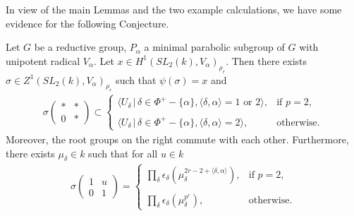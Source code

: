 In view of the main Lemmas and the two example calculations, we have some evidence for the following Conjecture.
\begin{conjecture} Let $G$ be a reductive group, $P_\alpha$ a minimal parabolic subgroup of $G$ with unipotent radical $V_\alpha$. Let $x \in H^1(SL_2(k), V_\alpha)_{\rho_r}$. Then there exists $\sigma \in Z^1(SL_2(k), V_\alpha)_{\rho_r}$ such that $\psi(\sigma) = x$ and
\begin{align*}
	\sigma\left(\begin{matrix}* & * \\0 & *\end{matrix}\right) \subset
		\left\{\begin{array}{ll}
			\langle U_\delta \,|\, \delta \in \Phi^+ - \{\alpha\}, \langle \delta, \alpha \rangle = 1\textrm{ or }2\rangle, & \textrm{if }p = 2,\\ \\
			\langle U_\delta \,|\, \delta \in \Phi^+ - \{\alpha\}, \langle \delta, \alpha \rangle = 2\rangle, & \textrm{otherwise}.
		\end{array}\right.
\end{align*}
Moreover, the root groups on the right commute with each other. Furthermore, there exists $\mu_\delta \in k$ such that for all $u \in k$
\begin{align*}
	\sigma\left(\begin{matrix}1 & u\\0 & 1\end{matrix}\right) = 
		\left\{\begin{array}{ll}
			\prod_\delta \epsilon_\delta\left(\mu_\delta^{2{r-2+\langle \delta, \alpha\rangle}} \right), & \textrm{if }p = 2,\\ \\
			\prod_\delta \epsilon_\delta\left(\mu_\delta^{p^r} \right), & \textrm{otherwise}.
		\end{array}\right.
\end{align*}
\end{conjecture}

